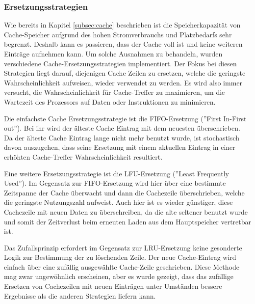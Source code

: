 \documentclass[a4paper,12pt]{article}
\begin{document}
\subsubsection{Ersetzungsstrategien}
 Wie bereits in Kapitel \ref{subsec:cache} beschrieben ist die Speicherkapazität von Cache-Speicher aufgrund des hohen Stromverbrauchs und Platzbedarfs sehr begrenzt. Deshalb kann es passieren, dass der Cache voll ist und keine weiteren Einträge aufnehmen kann. Um solche Ausnahmen zu behandeln, wurden verschiedene Cache-Ersetzungsstrategien implementiert. Der Fokus bei diesen Strategien liegt darauf, diejenigen Cache Zeilen zu ersetzen, welche die geringste Wahrscheinlichkeit aufweisen, wieder verwendet zu werden. Es wird also immer versucht, die Wahrscheinlichkeit für Cache-Treffer zu maximieren, um die Wartezeit des Prozessors auf Daten oder Instruktionen zu minimieren. \cite{mikroprozessortechnik2011}


\noindent Die einfachste Cache Ersetzungsstrategie ist die FIFO-Ersetzung (''First In-First out''). Bei ihr wird der älteste Cache Eintrag mit dem neuesten überschrieben. Da der älteste Cache Eintrag lange nicht mehr benutzt wurde, ist stochastisch davon auszugehen, dass seine Ersetzung mit einem aktuellen Eintrag in einer erhöhten Cache-Treffer Wahrscheinlichkeit resultiert.

\noindent Eine weitere Ersetzungsstrategie ist die LFU-Ersetzung (''Least Frequently Used''). Im Gegensatz zur FIFO-Ersetzung wird hier über eine bestimmte Zeitspanne der Cache überwacht und dann die Cachezeile überschrieben, welche die geringste Nutzungszahl aufweist. Auch hier ist es wieder günstiger, diese Cachezeile mit neuen Daten zu überschreiben, da die alte seltener benutzt wurde und somit der Zeitverlust beim erneuten Laden aus dem Hauptspeicher vertretbar ist.

\noindent Das Zufallsprinzip erfordert im Gegensatz zur LRU-Ersetzung keine gesonderte Logik zur Bestimmung der zu löschenden Zeile. Der neue Cache-Eintrag wird einfach über eine zufällig ausgewählte Cache-Zeile geschrieben. Diese Methode mag zwar ungewöhnlich erscheinen, aber es wurde gezeigt, dass das zufällige Ersetzen von Cachezeilen mit neuen Einträgen unter Umständen bessere Ergebnisse als die anderen Strategien liefern kann.\cite[S.185ff]{mikroprozessortechnik2011} \cite{smith1985instruction}
\end{document}
